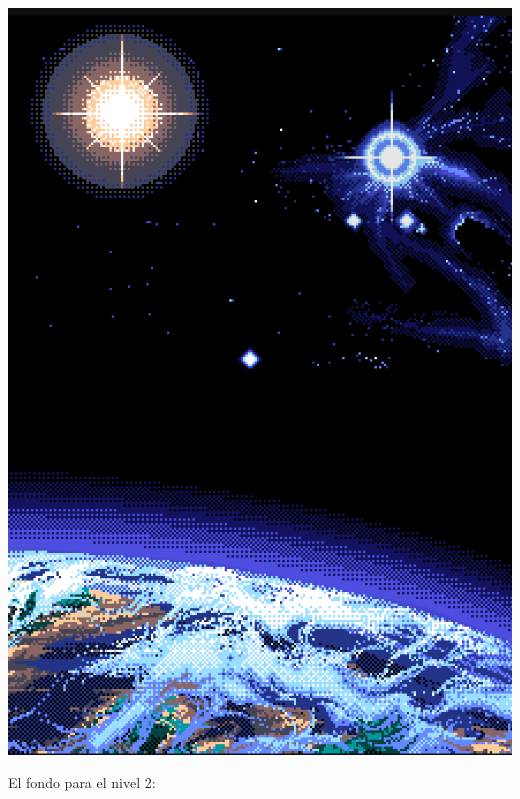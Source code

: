 \documentclass{article}
\begin{document}
\includegraphics[scale=0.40]{Ideación/Images/mapa1.png}

El fondo para el nivel 2:
\end{document}
